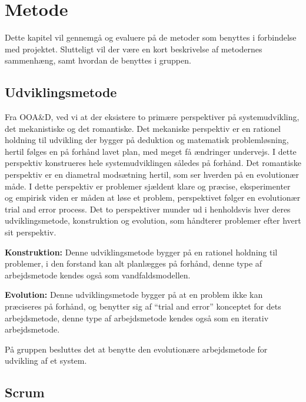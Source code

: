 \chapter{Metode}\label{chapter:Metode}

Dette kapitel vil gennemgå og evaluere på de metoder som benyttes i forbindelse med projektet.
Slutteligt vil der være en kort beskrivelse af metodernes sammenhæng, samt hvordan de benyttes i gruppen.

\section{Udviklingsmetode}
Fra OOA\&D, ved vi at der eksistere to primære perspektiver på systemudvikling, det mekanistiske og det romantiske.
Det mekaniske perspektiv er en rationel holdning til udvikling der bygger på deduktion og matematisk problemløsning, hertil følges en på forhånd lavet plan, med meget få ændringer undervejs.
I dette perspektiv konstrueres hele systemudviklingen således på forhånd.
Det romantiske perspektiv er en diametral modsætning hertil, som ser hverden på en evolutionær måde.
I dette perspektiv er problemer sjældent klare og præcise, eksperimenter og empirisk viden er måden at løse et problem, perspektivet følger en evolutionær trial and error process.
Det to perspektiver munder ud i henholdsvis hver deres udviklingsmetode, konstruktion og evolution, som håndterer problemer efter hvert sit perspektiv.\citep{OOA&D2001}

\textbf{Konstruktion:}
Denne udviklingsmetode bygger på en rationel holdning til problemer, i den forstand kan alt planlægges på forhånd, denne type af arbejdsmetode kendes også som vandfaldsmodellen.

\textbf{Evolution:}
Denne udviklingsmetode bygger på at en problem ikke kan præciseres på forhånd, og benytter sig af ``trial and error'' konceptet for dets arbejdsmetode, denne type af arbejdsmetode kendes også som en iterativ arbejdsmetode.

På gruppen besluttes det at benytte den evolutionære arbejdsmetode for udvikling af et system.

\section{Scrum}

